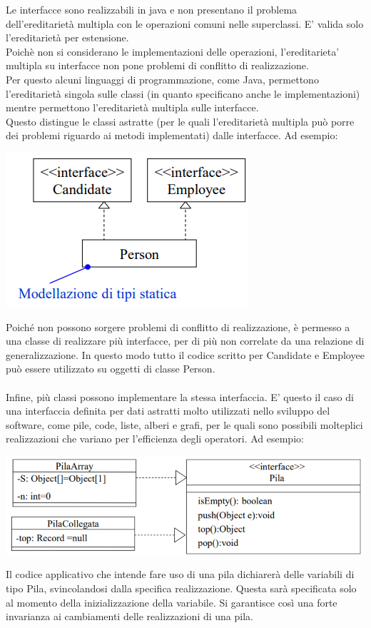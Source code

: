 \documentclass{article}
\begin{document}
	Le interfacce sono realizzabili in java e non presentano il problema dell'ereditarietà multipla con le operazioni comuni nelle superclassi. E' valida solo l'ereditarietà per estensione. \\
	Poichè non si considerano le implementazioni delle operazioni, l'ereditarieta' multipla su interfacce non pone problemi di conflitto di realizzazione.\\ 
	Per questo alcuni linguaggi di programmazione, come Java, permettono  l'ereditarietà singola sulle classi (in quanto specificano anche le implementazioni) mentre permettono l'ereditarietà multipla sulle interfacce. \\
	Questo distingue le classi astratte (per le quali l'ereditarietà multipla può porre dei problemi riguardo ai metodi implementati) dalle interfacce. Ad esempio:
	\begin{center}
		\includegraphics[scale=0.5]{assets/realizzazione_piu_interfacce.png}
	\end{center}
	Poiché non possono sorgere problemi di conflitto di realizzazione, è permesso a una classe di realizzare più interfacce, per di più non correlate da una relazione di generalizzazione. 	In questo modo tutto il codice scritto per Candidate e Employee può essere utilizzato su oggetti di classe Person. \\	\\
	Infine, più classi possono implementare la stessa interfaccia. E' questo il caso di una interfaccia definita per dati astratti molto utilizzati nello sviluppo del software, come pile, code, liste, alberi e grafi, per le quali sono possibili molteplici realizzazioni che variano per l'efficienza degli operatori. Ad esempio:
	\begin{center}
		\includegraphics[scale=0.5]{assets/realizzazione_multiple_interfaccia.png}
	\end{center}
	Il codice applicativo che intende fare uso di una pila dichiarerà delle variabili di tipo Pila, svincolandosi dalla specifica realizzazione. Questa sarà specificata solo al momento della inizializzazione della variabile. Si garantisce così una forte invarianza ai cambiamenti delle realizzazioni di una pila.
\end{document}
